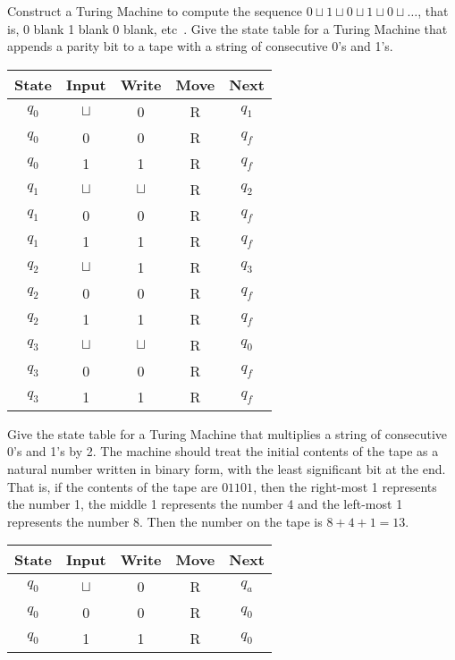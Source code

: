 \documentclass[addpoints,12pt]{exam}
\begin{document}
\begin{questions}
\question
  Construct a Turing Machine to compute the sequence $0 \sqcup 1 \sqcup 0 \sqcup 1 \sqcup 0 \sqcup \ldots$, that is, 0 blank 1 blank 0 blank, etc~\cite{turing37}.
  Give the state table for a Turing Machine that appends a parity bit to a tape with a string of consecutive 0's and 1's.
  \begin{solution}
    \begin{table}[H]
      \centering
      \begin{tabular}{ccccc}
        \toprule
            State & Input & Write & Move & Next \\
        \midrule
            $q_0$ & $\sqcup$ & 0 & R & $q_1$ \\
            $q_0$ & 0 & 0 & R & $q_f$ \\
            $q_0$ & 1 & 1 & R & $q_f$ \\
        \midrule
            $q_1$ & $\sqcup$ & $\sqcup$ & R & $q_2$ \\
            $q_1$ & 0 & 0 & R & $q_f$ \\
            $q_1$ & 1 & 1 & R & $q_f$ \\
        \midrule
            $q_2$ & $\sqcup$ & 1 & R & $q_3$ \\
            $q_2$ & 0 & 0 & R & $q_f$ \\
            $q_2$ & 1 & 1 & R & $q_f$ \\
        \midrule
            $q_3$ & $\sqcup$ & $\sqcup$ & R & $q_0$ \\
            $q_3$ & 0 & 0 & R & $q_f$ \\
            $q_3$ & 1 & 1 & R & $q_f$ \\
        \bottomrule
        \hline
      \end{tabular}
    \end{table}
  \end{solution}


\question
  Give the state table for a Turing Machine that multiplies a string of consecutive 0's and 1's by 2.
  The machine should treat the initial contents of the tape as a natural number written in binary form, with the least significant bit at the end.
  That is, if the contents of the tape are $01101$, then the right-most 1 represents the number 1, the middle 1 represents the number 4 and the left-most 1 represents the number 8.
  Then the number on the tape is $8+4+1=13$.
  \begin{solution}
    \begin{table}[H]
      \centering
      \begin{tabular}{ccccc}
        \toprule
            State & Input & Write & Move & Next \\
        \midrule
            $q_0$ & $\sqcup$ & 0 & R & $q_a$ \\
            $q_0$ & 0 & 0 & R & $q_0$ \\
            $q_0$ & 1 & 1 & R & $q_0$ \\
        \bottomrule
        \hline
      \end{tabular}
    \end{table}
  \end{solution}



\end{questions}
\end{document}
